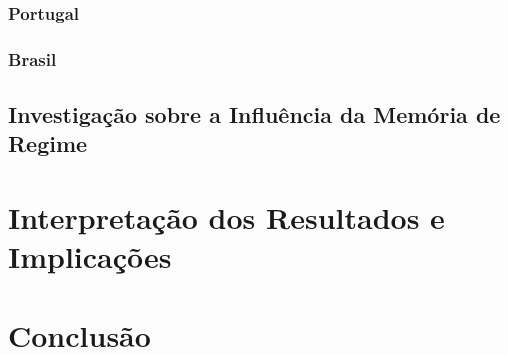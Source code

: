 \subsubsection{Portugal}

\subsubsection{Brasil}

\subsection{Investigação sobre a Influência da Memória de Regime}


\section{Interpretação dos Resultados e Implicações}

\section{Conclusão}

